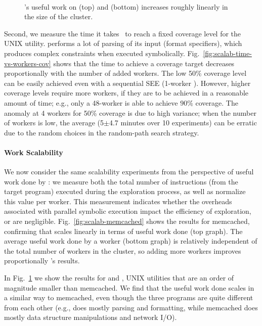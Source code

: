 \begin{figure}[h!]
  \centering
   \\
  \caption{\cnine's useful work on  (top) and  (bottom) increases roughly linearly in the size of the cluster.}  
  \label{fig:scalab}
\end{figure}

Second, we measure the time it takes \cnine\ to reach a fixed coverage level for the  UNIX utility.   performs a lot of parsing of its input (format specifiers), which produces complex constraints when executed symbolically.   Fig.~\ref{fig:scalab-time-vs-workers-cov} shows that the time to achieve a coverage target decreases proportionally with the number of added workers.  The low 50\% coverage level can be easily achieved even with a sequential SEE (1-worker \cnine). However, higher coverage levels require more workers, if they are to be achieved in a reasonable amount of time; e.g., only a 48-worker \cnine is able to achieve  $90\%$ coverage.  The anomaly at 4 workers for 50\% coverage is due to high variance; when the number of workers is low, the average (5$\pm$4.7 minutes over 10 experiments) can be erratic due to the random choices in the random-path search strategy.

\paragraph{Work Scalability} We now consider the same scalability experiments from the perspective of useful work done by \cnine: we measure both the total number of instructions (from the target program) executed during the exploration process, as well as normalize this value per worker. This measurement indicates whether the overheads associated with parallel symbolic execution impact the efficiency of exploration, or are negligible. Fig.~\ref{fig:scalab-memcached} shows the results for memcached, confirming that \cnine scales linearly in terms of useful work done (top graph).  The average useful work done by a worker (bottom graph) is relatively independent of the total number of workers in the cluster, so adding more workers improves proportionally \cnine's results.

In Fig.~\ref{fig:scalab} we show the results for  and , UNIX utilities that are an order of magnitude smaller than memcached. We find that the useful work done scales in a similar way to memcached, even though the three programs are quite different from each other (e.g.,  does mostly parsing and formatting, while memcached does mostly data structure manipulations and network I/O).


